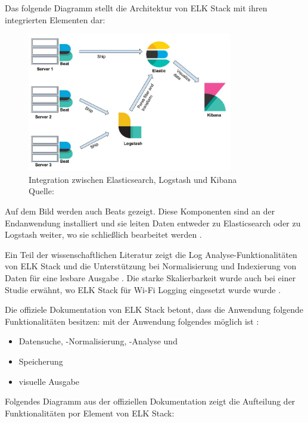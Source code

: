 Das folgende Diagramm stellt die Architektur von ELK Stack mit ihren integrierten Elementen  dar:

\begin{figure}[H]
   \centering
   \includegraphics[width=0.8\textwidth]{assets/2_p8.png}
   \caption{Integration zwischen Elasticsearch, Logstash und Kibana\\Quelle: \citep{packt_elkstack} }
   \centering
\end{figure}

Auf dem Bild werden auch Beats gezeigt. Diese Komponenten sind an der Endanwendung installiert und sie leiten Daten entweder zu Elasticsearch oder zu Logstash weiter, wo sie schließlich bearbeitet werden \citep{Jain_LMELK}. 

Ein Teil der wissenschaftlichen Literatur zeigt die Log Analyse-Funktionalitäten von ELK Stack und die Unterstützung bei Normalisierung und Indexierung von Daten für eine lesbare Ausgabe \citep{Advani_elkstakc}. Die starke Skalierbarkeit wurde auch bei einer Studie erwähnt, wo ELK Stack für Wi-Fi Logging eingesetzt wurde wurde \citep{Wang_elkwifi}.

Die offiziele Dokumentation von ELK Stack betont, dass die Anwendung folgende Funktionalitäten besitzen:  mit der Anwendung folgendes möglich ist \citep{elastic_docs}:

\begin{itemize}[noitemsep]
   \item Datensuche, -Normalisierung, -Analyse und 
   \item Speicherung
   \item visuelle Ausgabe
\end{itemize}

Folgendes Diagramm aus der offiziellen Dokumentation zeigt die Aufteilung der Funktionalitäten por Element von ELK Stack:

